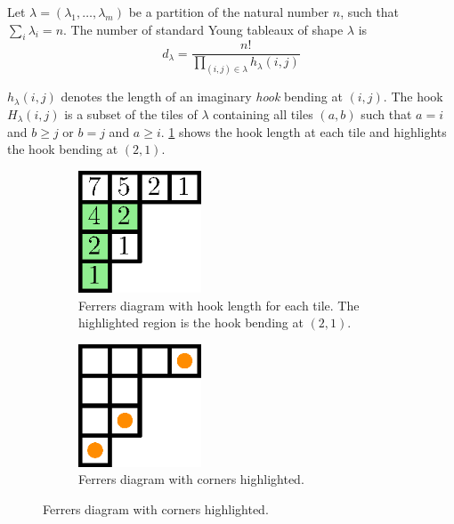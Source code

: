 \begin{theorem}
\label{theorem:xy:lattice:hook}
Let \(\lambda = (\lambda_1,\ldots,\lambda_m)\) be a partition of the natural
number \(n\), \ie such that \(\sum_i \lambda_i = n\). The number of standard
Young tableaux of shape \(\lambda\) is
\begin{displaymath}
d_{\lambda} = \frac{n!}{\prod_{(i,j) \in \lambda} h_{\lambda}(i,j)}
\end{displaymath}
\end{theorem}

\(h_{\lambda}(i,j)\) denotes the length of an imaginary \emph{hook} bending at
\((i,j)\). The hook \(H_{\lambda}(i,j)\) is a subset of the tiles of
\(\lambda\) containing all tiles \((a,b)\) such that \(a = i\) and \(b \ge j\)
or \(b = j\) and \(a \ge i\). \ref{fig:xy:lattice:hooks} shows the hook length
at each tile and highlights the hook bending at \((2,1)\).

\begin{figure}
\centering
\begin{subfigure}[b]{0.49\textwidth}
\centering
	\includegraphics[width=0.4\textwidth]{fig/x+y/lattice/hooks}
	\caption{Ferrers diagram with hook length for each tile. The highlighted
region is the hook bending at \((2,1)\).}
	\label{fig:xy:lattice:hooks}
\end{subfigure}
\begin{subfigure}[b]{0.49\textwidth}
\centering
	\includegraphics[width=0.4\textwidth]{fig/x+y/lattice/corners}
	\caption{Ferrers diagram with corners highlighted.}
	\label{fig:xy:lattice:corners}
\end{subfigure}
\end{figure}

